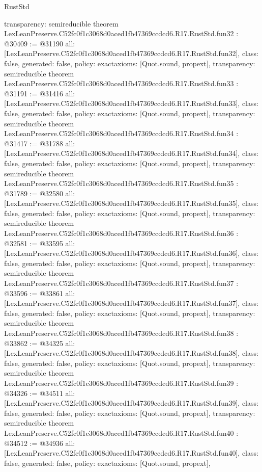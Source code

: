 \begin{lexlean}{RustStd}
\begin{coremodule}
{  transparency: semireducible
}
theorem LexLeanPreserve.C52fc0f1c3068d0aced1fb47369ccdcd6.R17.RustStd.fun32 : @30409 := @31190 {
  all: [LexLeanPreserve.C52fc0f1c3068d0aced1fb47369ccdcd6.R17.RustStd.fun32],
  class: false,
  generated: false,
  policy: exact{axioms: [Quot.sound, propext]},
  transparency: semireducible
}
theorem LexLeanPreserve.C52fc0f1c3068d0aced1fb47369ccdcd6.R17.RustStd.fun33 : @31191 := @31416 {
  all: [LexLeanPreserve.C52fc0f1c3068d0aced1fb47369ccdcd6.R17.RustStd.fun33],
  class: false,
  generated: false,
  policy: exact{axioms: [Quot.sound, propext]},
  transparency: semireducible
}
theorem LexLeanPreserve.C52fc0f1c3068d0aced1fb47369ccdcd6.R17.RustStd.fun34 : @31417 := @31788 {
  all: [LexLeanPreserve.C52fc0f1c3068d0aced1fb47369ccdcd6.R17.RustStd.fun34],
  class: false,
  generated: false,
  policy: exact{axioms: [Quot.sound, propext]},
  transparency: semireducible
}
theorem LexLeanPreserve.C52fc0f1c3068d0aced1fb47369ccdcd6.R17.RustStd.fun35 : @31789 := @32580 {
  all: [LexLeanPreserve.C52fc0f1c3068d0aced1fb47369ccdcd6.R17.RustStd.fun35],
  class: false,
  generated: false,
  policy: exact{axioms: [Quot.sound, propext]},
  transparency: semireducible
}
theorem LexLeanPreserve.C52fc0f1c3068d0aced1fb47369ccdcd6.R17.RustStd.fun36 : @32581 := @33595 {
  all: [LexLeanPreserve.C52fc0f1c3068d0aced1fb47369ccdcd6.R17.RustStd.fun36],
  class: false,
  generated: false,
  policy: exact{axioms: [Quot.sound, propext]},
  transparency: semireducible
}
theorem LexLeanPreserve.C52fc0f1c3068d0aced1fb47369ccdcd6.R17.RustStd.fun37 : @33596 := @33861 {
  all: [LexLeanPreserve.C52fc0f1c3068d0aced1fb47369ccdcd6.R17.RustStd.fun37],
  class: false,
  generated: false,
  policy: exact{axioms: [Quot.sound, propext]},
  transparency: semireducible
}
theorem LexLeanPreserve.C52fc0f1c3068d0aced1fb47369ccdcd6.R17.RustStd.fun38 : @33862 := @34325 {
  all: [LexLeanPreserve.C52fc0f1c3068d0aced1fb47369ccdcd6.R17.RustStd.fun38],
  class: false,
  generated: false,
  policy: exact{axioms: [Quot.sound, propext]},
  transparency: semireducible
}
theorem LexLeanPreserve.C52fc0f1c3068d0aced1fb47369ccdcd6.R17.RustStd.fun39 : @34326 := @34511 {
  all: [LexLeanPreserve.C52fc0f1c3068d0aced1fb47369ccdcd6.R17.RustStd.fun39],
  class: false,
  generated: false,
  policy: exact{axioms: [Quot.sound, propext]},
  transparency: semireducible
}
theorem LexLeanPreserve.C52fc0f1c3068d0aced1fb47369ccdcd6.R17.RustStd.fun40 : @34512 := @34936 {
  all: [LexLeanPreserve.C52fc0f1c3068d0aced1fb47369ccdcd6.R17.RustStd.fun40],
  class: false,
  generated: false,
  policy: exact{axioms: [Quot.sound, propext]},
}
\end{coremodule}
\end{lexlean}
